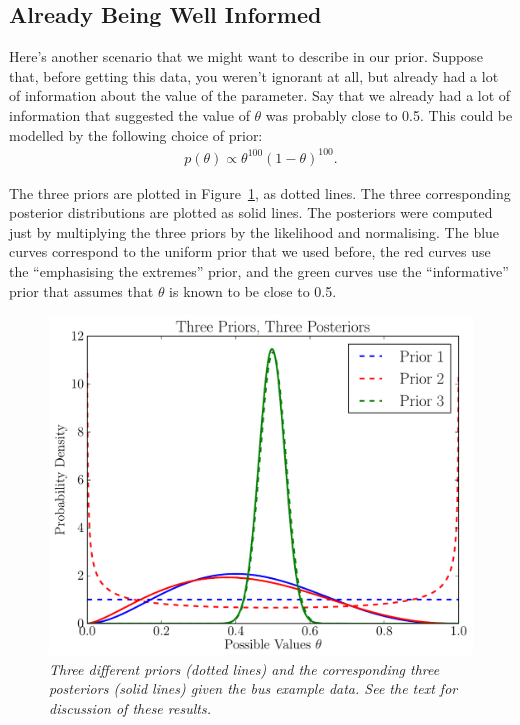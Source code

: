 \subsection{Already Being Well Informed}
Here's another scenario that we might want to describe in our prior.
Suppose that, before getting this data, you weren't ignorant at all, but already
had a lot of information about the value of the parameter. Say that we already had a lot of information that
suggested the value of $\theta$ was probably close to 0.5. This could be modelled
by the following choice of prior:
\begin{eqnarray}
p(\theta) \propto \theta^{100}(1 - \theta)^{100}.\label{eq:prior3}
\end{eqnarray}

The three priors are plotted in Figure~\ref{fig:three_priors}, as dotted lines.
The three corresponding posterior distributions are plotted as solid lines.
The posteriors were computed just by multiplying the three priors by the likelihood
and normalising.
The blue curves correspond to the uniform prior that we used before, the red
curves use the ``emphasising the extremes'' prior, and the green curves use the
``informative'' prior that assumes that $\theta$ is known to be close to 0.5.

\begin{figure}[h!]
\begin{center}
\includegraphics[scale=0.6]{Figures/three_priors.pdf}
\caption{\it Three different priors (dotted lines) and the corresponding
three posteriors (solid lines) given the bus example data. See the text
for discussion of these results.\label{fig:three_priors}}
\end{center}
\end{figure}

